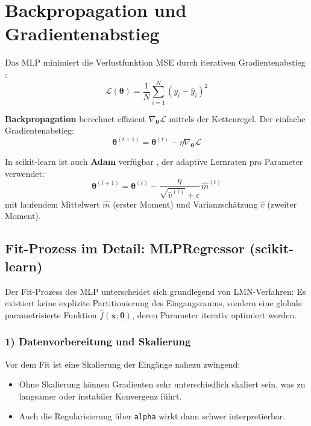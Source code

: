 \documentclass[11pt,a4paper]{report}
\begin{document}
\section{Backpropagation und Gradientenabstieg}
\label{sec:backpropagation}

Das MLP minimiert die Verlustfunktion MSE durch iterativen Gradientenabstieg
\cite{rumelhart1986, goodfellow2016}:
\begin{equation}
\mathcal{L}(\boldsymbol{\theta}) = \frac{1}{N}\sum_{i=1}^N (y_i - \hat{y}_i)^2
\end{equation}

\textbf{Backpropagation} berechnet effizient $\nabla_{\boldsymbol{\theta}} \mathcal{L}$
mittels der Kettenregel. Der einfache Gradientenabstieg:
\begin{equation}
\boldsymbol{\theta}^{(t+1)} = \boldsymbol{\theta}^{(t)} - \eta \nabla_{\boldsymbol{\theta}} \mathcal{L}
\end{equation}

In scikit-learn ist auch \textbf{Adam} verf\"{u}gbar \cite{sklearn_mlp}, der adaptive Lernraten
pro Parameter verwendet:
\begin{equation}
\boldsymbol{\theta}^{(t+1)} =
\boldsymbol{\theta}^{(t)} - \frac{\eta}{\sqrt{\hat{v}^{(t)}}+\epsilon}\,\hat{m}^{(t)}
\end{equation}
mit laufendem Mittelwert $\hat{m}$ (erster Moment) und Varianzsch\"{a}tzung $\hat{v}$
(zweiter Moment).

\subsection{Fit-Prozess im Detail: MLPRegressor (scikit-learn)}
\label{sec:mlp_fit_process}

Der Fit-Prozess des MLP unterscheidet sich grundlegend von LMN-Verfahren: Es existiert
keine explizite Partitionierung des Eingangsraums, sondern eine globale parametrisierte
Funktion $\hat{f}(\mathbf{x};\boldsymbol{\theta})$, deren Parameter iterativ optimiert
werden.

\subsubsection{1) Datenvorbereitung und Skalierung}
Vor dem Fit ist eine Skalierung der Eing\"{a}nge nahezu zwingend:
\begin{itemize}
\item Ohne Skalierung k\"{o}nnen Gradienten sehr unterschiedlich skaliert sein, was zu
      langsamer oder instabiler Konvergenz f\"{u}hrt.
\item Auch die Regularisierung \"{u}ber \texttt{alpha} wirkt dann schwer interpretierbar.
\end{itemize}
\end{document}

